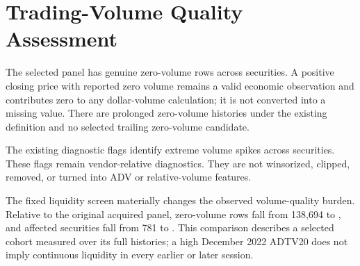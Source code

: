 \section{Trading-Volume Quality Assessment}

The selected panel has \ZeroVolumeRows{} genuine zero-volume rows across
\ZeroVolumeSecurities{} securities. A positive closing price with reported zero
volume remains a valid economic observation and contributes zero to any
dollar-volume calculation; it is not converted into a missing value. There are
\ProlongedZeroVolumeSecurities{} prolonged zero-volume histories under the
existing definition and no selected trailing zero-volume candidate.

The existing diagnostic flags identify \ExtremeVolumeSpikes{} extreme volume
spikes across \ExtremeVolumeSpikeSecurities{} securities. These flags remain
vendor-relative diagnostics. They are not winsorized, clipped, removed, or
turned into ADV or relative-volume features.

The fixed liquidity screen materially changes the observed volume-quality
burden. Relative to the original acquired panel, zero-volume rows fall from
138,694 to \ZeroVolumeRows{}, and affected securities fall from 781 to
\ZeroVolumeSecurities{}. This comparison describes a selected cohort measured
over its full histories; a high December 2022 ADTV20 does not imply
continuous liquidity in every earlier or later session.
